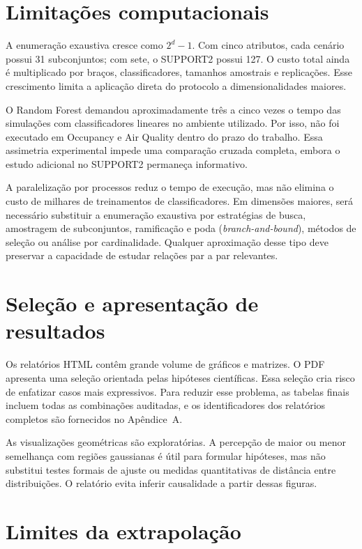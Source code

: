 \section{Limitações computacionais}

A enumeração exaustiva cresce como $2^d-1$. Com cinco atributos, cada cenário possui 31 subconjuntos; com sete, o SUPPORT2 possui 127. O custo total ainda é multiplicado por braços, classificadores, tamanhos amostrais e replicações. Esse crescimento limita a aplicação direta do protocolo a dimensionalidades maiores.

O Random Forest demandou aproximadamente três a cinco vezes o tempo das simulações com classificadores lineares no ambiente utilizado. Por isso, não foi executado em Occupancy e Air Quality dentro do prazo do trabalho. Essa assimetria experimental impede uma comparação cruzada completa, embora o estudo adicional no SUPPORT2 permaneça informativo.

A paralelização por processos reduz o tempo de execução, mas não elimina o custo de milhares de treinamentos de classificadores. Em dimensões maiores, será necessário substituir a enumeração exaustiva por estratégias de busca, amostragem de subconjuntos, ramificação e poda (\textit{branch-and-bound}), métodos de seleção ou análise por cardinalidade. Qualquer aproximação desse tipo deve preservar a capacidade de estudar relações par a par relevantes.

\section{Seleção e apresentação de resultados}

Os relatórios HTML contêm grande volume de gráficos e matrizes. O PDF apresenta uma seleção orientada pelas hipóteses científicas. Essa seleção cria risco de enfatizar casos mais expressivos. Para reduzir esse problema, as tabelas finais incluem todas as combinações auditadas, e os identificadores dos relatórios completos são fornecidos no Apêndice~A.

As visualizações geométricas são exploratórias. A percepção de maior ou menor semelhança com regiões gaussianas é útil para formular hipóteses, mas não substitui testes formais de ajuste ou medidas quantitativas de distância entre distribuições. O relatório evita inferir causalidade a partir dessas figuras.

\section{Limites da extrapolação}

